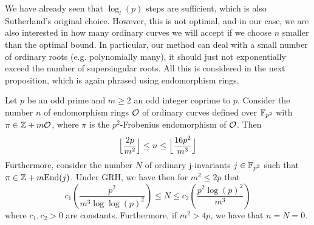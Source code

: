 We have already seen that $\log_l(p)$ steps are sufficient, which is also Sutherland's original choice.
However, this is not optimal, and in our case, we are also interested in how many ordinary curves we will accept if we choose $n$ smaller than the optimal bound.
In particular, our method can deal with a small number of ordinary roots (e.g. polynomially many), it should just not exponentially exceed the number of supersingular roots.
All this is considered in the next proposition, which is again phrased using endomorphism rings.
\begin{prop}
    \label{prop:counting_fp2_vulcano_levels}
    Let $p$ be an odd prime and $m \geq 2$ an odd integer coprime to $p$.
    Consider the number $n$ of endomorphism rings $\mathcal{O}$ of ordinary curves defined over $\mathbb{F}_{p^2}$ with $\pi \in \mathbb{Z} + m\mathcal{O}$, where $\pi$ is the $p^2$-Frobenius endomorphism of $\mathcal{O}$.
    Then
    \begin{equation*}
        \Bigl\lfloor \frac {2p} {m^2} \Bigr\rfloor \leq n \leq \Bigl\lfloor \frac {16p^2} {m^3} \Bigr\rfloor
    \end{equation*}
    Furthermore, consider the number $N$ of ordinary j-invariants $j \in \mathbb{F}_{p^2}$ such that $\pi \in \mathbb{Z} + m\mathrm{End}(j)$.
    Under GRH, we have then for $m^2 \leq 2p$ that
    \begin{equation*}
        c_1\left( \frac {p^2} {m^3 \log\log(p)^2} \right) \leq N \leq c_2\left( \frac {p^2\log(p)^2} {m^3} \right)
    \end{equation*}
    where $c_1, c_2 > 0$ are constants.
    Furthermore, if $m^2 > 4p$, we have that $n = N = 0$.
\end{prop}

